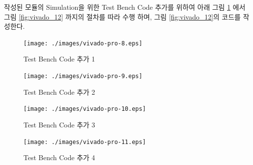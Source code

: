 \documentclass[11pt
  , a4paper
  , article
  , oneside
]{memoir}
\begin{document}
작성된 모듈의 Simulation을 위한 Test Bench Code 추가를 위하여 아래 그림 \ref{fig:vivado_8} 에서 그림 \ref{fig:vivado_12} 까지의 절차를 따라 수행 하며, 그림 \ref{fig:vivado_12}의 코드를 작성한다.

\begin{figure}[h!]
	\centering
	\texttt{[image: ./images/vivado-pro-8.eps]}
	\caption{Test Bench Code 추가 1}
	\label{fig:vivado_8} 
\end{figure}	

\begin{figure}[h!]
	\centering
	\texttt{[image: ./images/vivado-pro-9.eps]}
	\caption{Test Bench Code 추가 2}
	\label{fig:vivado_9} 
\end{figure}	


\begin{figure}[h!]
	\centering
	\texttt{[image: ./images/vivado-pro-10.eps]}
	\caption{Test Bench Code 추가 3}
	\label{fig:vivado_10} 
\end{figure}	

\begin{figure}[h!]
	\centering
	\texttt{[image: ./images/vivado-pro-11.eps]}
	\caption{Test Bench Code 추가 4}
	\label{fig:vivado_11} 
\end{figure}
\end{document}
